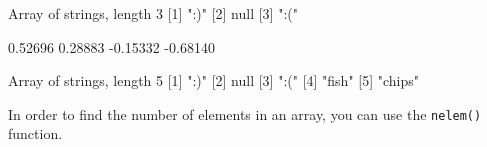 \begin{code}
Array of strings, length 3
[1] ":)"
[2] null
[3] ":("

     0.52696      0.28883 
    -0.15332     -0.68140 

Array of strings, length 5
[1] ":)"
[2] null
[3] ":("
[4] "fish"
[5] "chips"
\end{code}

In order to find the number of elements in an array, you can use the
\texttt{nelem()} function.


